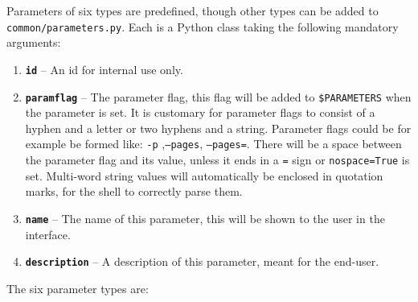 \documentclass[a4paper,12pt]{report}
\begin{document}
Parameters of six types are predefined, though other types can be added to \texttt{common/parameters.py}. Each is a Python class taking the following mandatory arguments:

\begin{enumerate}
\item \textbf{\texttt{id}} -- An id for internal use only.
\item \textbf{\texttt{paramflag}} -- The parameter flag, this flag will be added to \texttt{\$PARAMETERS} when the parameter is set. It is customary for parameter flags to consist of a hyphen and a letter or two hyphens and a string. Parameter flags could be for example be formed like: \texttt{-p} ,\texttt{--pages}, \texttt{--pages=}. There will be a space between the parameter flag and its value, unless it ends in a \texttt{=} sign or \texttt{nospace=True} is set. Multi-word string values will automatically be enclosed in quotation marks, for the shell to correctly parse them.
\item \textbf{\texttt{name}} -- The name of this parameter, this will be shown to the user in the interface.
\item \textbf{\texttt{description}} -- A description of this parameter, meant for the end-user.
\end{enumerate}


The six parameter types are:
\end{document}
